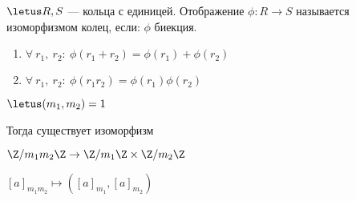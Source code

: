 \begin{defn}
    $\letus R, S$ --- кольца с единицей. Отображение $\phi: R \to S$ называется изоморфизмом колец, если: $\phi$ биекция.
    
    \begin{enumerate}
        \item $\forall\ r_1,~ r_2:\ \phi(r_1 + r_2) = \phi(r_1) + \phi(r_2)$
        
        \item $\forall\ r_1,~ r_2:\ \phi(r_1 r_2) = \phi(r_1) \phi(r_2)$
    \end{enumerate}
\end{defn}

\begin{theorem-non}
    $\letus (m_1, m_2) = 1$ 

    Тогда существует изоморфизм 
    
    $\Z/m_1m_2\Z \to \Z/m_1\Z \times \Z/m_2\Z$
    
    $[a]_{m_1m_2} \mapsto ([a]_{m_1}, [a]_{m_2})$
\end{theorem-non}

